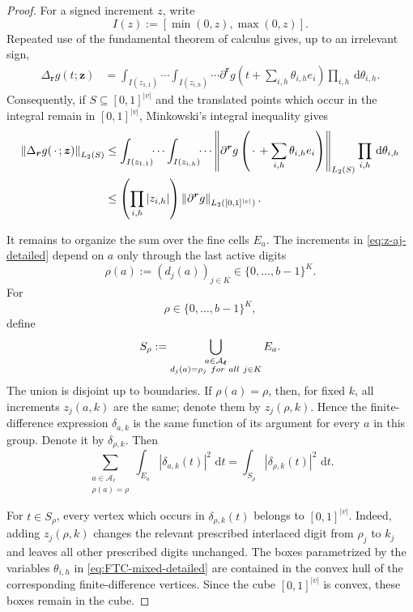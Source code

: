\documentclass[10pt,a4paper]{amsart}
\newcommand{\dd}{\,\mathrm d}
\begin{document}
\begin{proof}
For a signed increment $z$, write
\[
 I(z):=[\min(0,z),\max(0,z)].
\]
Repeated use of the fundamental theorem of calculus gives, up to an
irrelevant sign,
\begin{align}
 \Delta_{\boldsymbol r}g(t;\boldsymbol z)
 &=
 \int_{I(z_{1,1})}\!\!\cdots
 \int_{I(z_{i,h})}\!\!\cdots
 \partial^{\boldsymbol r}g
 \left(
   t+\sum_{i,h}\theta_{i,h}e_i
 \right)
 \prod_{i,h}\dd\theta_{i,h}.
 \label{eq:FTC-mixed-detailed}
\end{align}
Consequently, if $S\subseteq[0,1]^{|v|}$ and the translated points
which occur in the integral remain in $[0,1]^{|v|}$, Minkowski's
integral inequality gives
\begin{align}
 \left\|
 \Delta_{\boldsymbol r}g(\,\cdot\,;\boldsymbol z)
 \right\|_{L_2(S)}
 &\le
 \int_{I(z_{1,1})}\!\!\cdots
 \int_{I(z_{i,h})}\!\!\cdots
 \left\|
 \partial^{\boldsymbol r}g
 \left(
   \,\cdot\,
   +\sum_{i,h}\theta_{i,h}e_i
 \right)
 \right\|_{L_2(S)}
 \prod_{i,h}\dd\theta_{i,h}
 \notag\\
 &\le
 \left(\prod_{i,h}|z_{i,h}|\right)
 \left\|
   \partial^{\boldsymbol r}g
 \right\|_{L_2([0,1]^{|v|})}.
 \label{eq:finite-difference-L2-detailed}
\end{align}

It remains to organize the sum over the fine cells $E_a$.  The
increments in \eqref{eq:z-aj-detailed} depend on $a$ only through
the last active digits
\[
 \rho(a):=(d_j(a))_{j\in K}
 \in\{0,\ldots,b-1\}^{K}.
\]
For
\[
 \rho\in\{0,\ldots,b-1\}^{K},
\]
define
\[
 S_\rho
 :=
 \bigcup_{\substack{
 a\in\mathcal A_{\boldsymbol\ell}\\
 d_j(a)=\rho_j\ {\rm for\ all}\ j\in K}}
 E_a.
\]
The union is disjoint up to boundaries.  If $\rho(a)=\rho$, then,
for fixed $k$, all increments $z_j(a,k)$ are the same; denote them
by $z_j(\rho,k)$.  Hence the finite-difference expression
$\delta_{a,k}$ is the same function of its argument for every
$a$ in this group.  Denote it by $\delta_{\rho,k}$.  Then
\begin{equation}\label{eq:group-last-digits-detailed}
 \sum_{\substack{
 a\in\mathcal A_{\boldsymbol\ell}\\
 \rho(a)=\rho}}
 \int_{E_a}|\delta_{a,k}(t)|^2\,\dd t
 =
 \int_{S_\rho}|\delta_{\rho,k}(t)|^2\,\dd t.
\end{equation}

For $t\in S_\rho$, every vertex which occurs in
$\delta_{\rho,k}(t)$ belongs to $[0,1]^{|v|}$.  Indeed, adding
$z_j(\rho,k)$ changes the relevant prescribed interlaced digit
from $\rho_j$ to $k_j$ and leaves all other prescribed digits
unchanged.  The boxes parametrized by the variables
$\theta_{i,h}$ in \eqref{eq:FTC-mixed-detailed} are contained in
the convex hull of the corresponding finite-difference vertices.
Since the cube $[0,1]^{|v|}$ is convex, these boxes remain in the
cube.


\end{proof}
\end{document}

